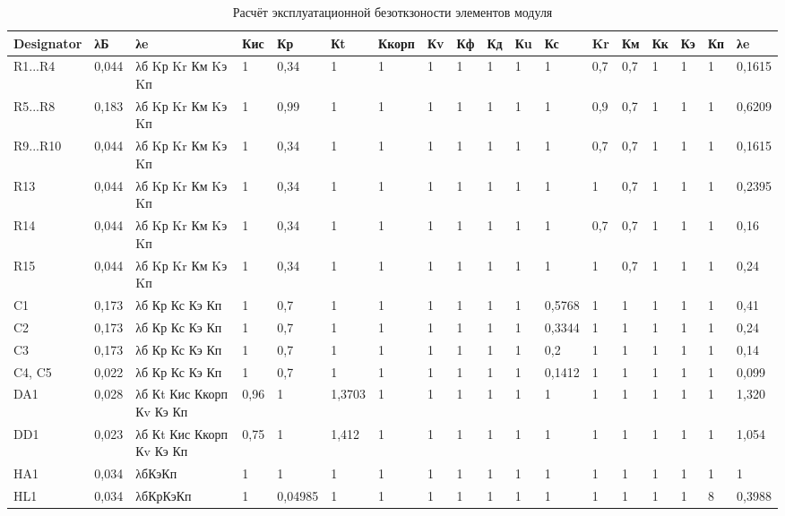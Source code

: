 \begin{enumerate}
\begin{sidewaystable}
  \centering
  \small
  \caption{Расчёт эксплуатационной безоткзоности элементов модуля}
  \begin{tabular}{|l |l |l |l |l |l |l |l |l |l |l |l |l |l |l |l |l |l |}
    \hline
Designator  &   λБ  & λe                 & Кис & Кр & Кt & Ккорп & Кv & Кф & Кд & Кu & Кс & Kr & Км & Кк & Кэ & Кп & λe   \\ \hline
R1...R4     & 0,044 & λб Kр Kr Км Kэ Kп  & 1 & 0,34 & 1 & 1 & 1 & 1 & 1 & 1 & 1 & 0,7 & 0,7 & 1 & 1 & 1 & 0,1615 \\ \hline
R5...R8     & 0,183 & λб Kр Kr Км Kэ Kп  & 1 & 0,99 & 1 & 1 & 1 & 1 & 1 & 1 & 1 & 0,9 & 0,7 & 1 & 1 & 1 & 0,6209 \\ \hline
R9...R10    & 0,044 & λб Kр Kr Км Kэ Kп  & 1 & 0,34 & 1 & 1 & 1 & 1 & 1 & 1 & 1 & 0,7 & 0,7 & 1 & 1 & 1 & 0,1615 \\ \hline
R13         & 0,044 & λб Kр Kr Км Kэ Kп  & 1 & 0,34 & 1 & 1 & 1 & 1 & 1 & 1 & 1 & 1 & 0,7 & 1 & 1 & 1 & 0,2395  \\ \hline
R14         & 0,044 & λб Kр Kr Км Kэ Kп  & 1 & 0,34 & 1 & 1 & 1 & 1 & 1 & 1 & 1 & 0,7 & 0,7 & 1 & 1 & 1 & 0,16 \\ \hline
R15         & 0,044 & λб Kр Kr Км Kэ Kп  & 1 & 0,34 & 1 & 1 & 1 & 1 & 1 & 1 & 1 & 1 & 0,7 & 1 & 1 & 1 & 0,24  \\ \hline
C1          & 0,173 & λб Кр Кс Кэ Кп  & 1 & 0,7 & 1 & 1 & 1 & 1 & 1 & 1 & 0,5768 & 1 & 1 & 1 & 1 & 1 & 0,41 \\ \hline
C2          & 0,173 & λб Кр Кс Кэ Кп  & 1 & 0,7 & 1 & 1 & 1 & 1 & 1 & 1 & 0,3344 & 1 & 1 & 1 & 1 & 1 & 0,24 \\ \hline
C3          & 0,173 & λб Кр Кс Кэ Кп  & 1 & 0,7 & 1 & 1 & 1 & 1 & 1 & 1 & 0,2 & 1 & 1 & 1 & 1 & 1 & 0,14 \\ \hline
C4, C5      & 0,022 & λб Кр Кс Кэ Кп  & 1 & 0,7 & 1 & 1 & 1 & 1 & 1 & 1 & 0,1412 & 1 & 1 & 1 & 1 & 1 & 0,099 \\ \hline
DA1         & 0,028 & λб Кt Кис Ккорп Кv Кэ Кп & 0,96 & 1 & 1,3703 & 1 & 1 & 1 & 1 & 1 & 1 & 1 & 1 & 1 & 1 & 1 & 1,320 \\ \hline
DD1         & 0,023 & λб Кt Кис Ккорп Кv Кэ Кп & 0,75 & 1 & 1,412 & 1 & 1 & 1 & 1 & 1 & 1 & 1 & 1 & 1 & 1 & 1 & 1,054 \\ \hline
HA1         & 0,034 & λбКэКп & 1 & 1 & 1 & 1 & 1 & 1 & 1 & 1 & 1 & 1 & 1 & 1 & 1 & 1 & 1 \\ \hline
HL1         & 0,034 & λбКрКэКп & 1 & 0,04985 & 1 & 1 & 1 & 1 & 1 & 1 & 1 & 1 & 1 & 1 & 1 & 8 & 0,3988 \\ \hline

\end{tabular}
\end{sidewaystable}
\end{enumerate}
